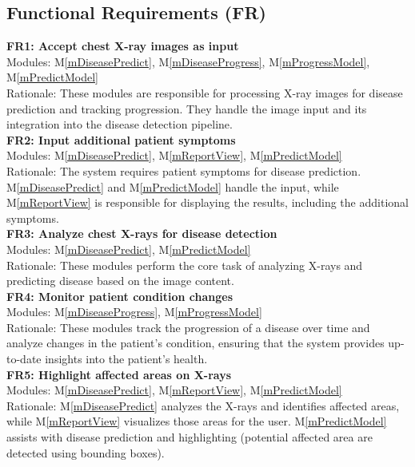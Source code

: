 \documentclass[12pt, titlepage]{article}
\newcommand{\mref}[1]{M\ref{#1}}
\begin{document}
\subsection{Functional Requirements (FR)}
\textbf{FR1: Accept chest X-ray images as input} \\
Modules: \mref{mDiseasePredict}, \mref{mDiseaseProgress}, \mref{mProgressModel}, \mref{mPredictModel} \\
Rationale: These modules are responsible for processing X-ray images for disease prediction and tracking progression. They handle the image input and its integration into the disease detection pipeline. \\
\newline
\textbf{FR2: Input additional patient symptoms} \\
Modules: \mref{mDiseasePredict}, \mref{mReportView}, \mref{mPredictModel} \\
Rationale: The system requires patient symptoms for disease prediction. \mref{mDiseasePredict} and \mref{mPredictModel} handle the input, while \mref{mReportView} is responsible for displaying the results, including the additional symptoms. \\
\newline
\textbf{FR3: Analyze chest X-rays for disease detection} \\
Modules: \mref{mDiseasePredict}, \mref{mPredictModel} \\
Rationale: These modules perform the core task of analyzing X-rays and predicting disease based on the image content. \\
\newline
\textbf{FR4: Monitor patient condition changes} \\
Modules: \mref{mDiseaseProgress}, \mref{mProgressModel} \\
Rationale: These modules track the progression of a disease over time and analyze changes in the patient’s condition, ensuring that the system provides up-to-date insights into the patient's health. \\
\newline
\textbf{FR5: Highlight affected areas on X-rays} \\
Modules: \mref{mDiseasePredict}, \mref{mReportView}, \mref{mPredictModel} \\
Rationale: \mref{mDiseasePredict} analyzes the X-rays and identifies affected areas, while \mref{mReportView} visualizes those areas for the user. \mref{mPredictModel} assists with disease prediction and highlighting (potential affected area are detected using bounding boxes). \\
\end{document}
